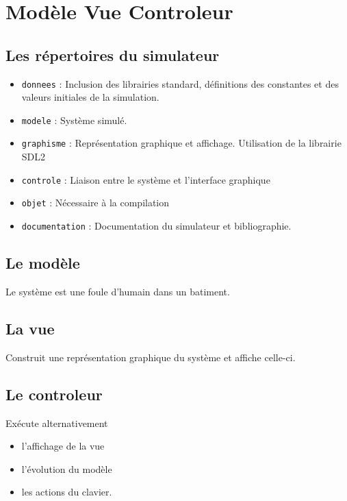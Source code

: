 %
\section{Modèle Vue Controleur}
%
%
\subsection{Les répertoires du simulateur}
\begin{itemize}[leftmargin=2cm]
\item \texttt{donnees} : Inclusion des librairies standard, définitions des constantes et des valeurs initiales de la simulation.
\item \texttt{modele} : Système simulé. 
\item \texttt{graphisme} : Représentation graphique et affichage. Utilisation de la librairie SDL2
\item \texttt{controle} : Liaison entre le système et l'interface graphique 
\item \texttt{objet} : Nécessaire à la compilation
\item \texttt{documentation} : Documentation du simulateur et bibliographie.
\end{itemize}
%
\subsection{Le modèle}
Le système est une foule d'humain dans un batiment.
%
\subsection{La vue}
Construit une représentation graphique du système et affiche celle-ci.
%
\subsection{Le controleur}
Exécute alternativement 
\begin{itemize}[leftmargin=2cm]
\item l'affichage de la vue
\item l'évolution du modèle
\item les actions du clavier.
\end{itemize}
%

